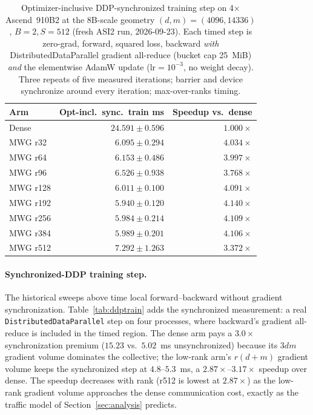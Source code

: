 \begin{table}[h]
\centering
\caption{Optimizer-inclusive DDP-synchronized training step on
4$\times$Ascend~910B2 at the 8B-scale geometry $(d,m)=(4096,14336)$,
$B{=}2,S{=}512$ (fresh ASI2 run, 2026-09-23).  Each timed step is zero-grad,
forward, squared loss, backward \emph{with} DistributedDataParallel gradient
all-reduce (bucket cap 25~MiB) \emph{and} the elementwise AdamW update
($\mathrm{lr}{=}10^{-3}$, no weight decay).  Three repeats of five measured
iterations; barrier and device synchronize around every iteration;
max-over-ranks timing.}
\label{tab:ddptrainopt}
\begin{tabular}{lrr}
\toprule
Arm & Opt-incl.\ sync.\ train ms & Speedup vs.\ dense \\
\midrule
Dense & $24.591\pm0.596$ & $1.000\times$ \\
MWG r32  & $6.095\pm0.294$ & $4.034\times$ \\
MWG r64  & $6.153\pm0.486$ & $3.997\times$ \\
MWG r96  & $6.526\pm0.938$ & $3.768\times$ \\
MWG r128 & $6.011\pm0.100$ & $4.091\times$ \\
MWG r192 & $5.940\pm0.120$ & $4.140\times$ \\
MWG r256 & $5.984\pm0.214$ & $4.109\times$ \\
MWG r384 & $5.989\pm0.201$ & $4.106\times$ \\
MWG r512 & $7.292\pm1.263$ & $3.372\times$ \\
\bottomrule
\end{tabular}
\end{table}

\paragraph{Synchronized-DDP training step.}
The historical sweeps above time local forward--backward without gradient
synchronization.  Table~\ref{tab:ddptrain} adds the synchronized
measurement: a real \texttt{DistributedDataParallel} step on four
processes,
where backward's gradient all-reduce is included in the timed region.  The
dense arm pays a $3.0\times$ synchronization premium ($15.23$ vs.\ $5.02$~ms
unsynchronized) because its $3dm$ gradient volume dominates the collective;
the low-rank arm's $r(d+m)$ gradient volume keeps the synchronized step at
$4.8$--$5.3$~ms, a $2.87\times$--$3.17\times$ speedup over dense.  The
speedup decreases with rank (r512 is lowest at $2.87\times$) as the
low-rank gradient volume approaches the dense communication cost, exactly
as the traffic model of Section~\ref{sec:analysis} predicts.

